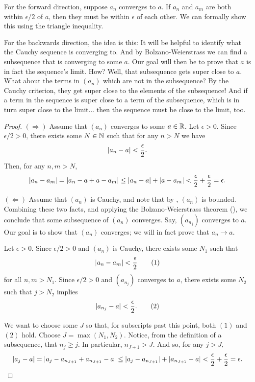 \begin{proofsketch}
  For the forward direction, suppose $a_n$ converges to $a$. If $a_n$
  and $a_m$ are both within $\epsilon / 2$ of $a$, then they must be
  within $\epsilon$ of each other. We can formally show this using
  the triangle inequality.

  For the backwards direction, the idea is this: It will be helpful
  to identify what the Cauchy sequence is converging to. And by
  Bolzano-Weierstrass we can find a subsequence that is converging to
  some $a$. Our goal will then be to prove that $a$ is in fact the
  sequence's limit. How? Well, that subsequence gets super close to
  $a$. What about the terms in $(a_n)$ which are not in the
  subsequence? By the Cauchy criterion, they get super close to the
  elements of the subsequence! And if a term in the sequence is super
  close to a term of the subsequence, which is in turn super close to
  the limit... then the sequence must be close to the limit, too.
\end{proofsketch}

\begin{proof}
  \phantom{.}

  $(\Rightarrow)$ Assume that $(a_n)$ converges to some $a \in \mathbb R$.
  Let $\epsilon > 0$. Since $\epsilon / 2 > 0$, there exists some $N
  \in \mathbb N$ such that for any $n > N$ we have
  \[
    | a_n - a | < \frac{\epsilon}{2}.
  \]
  Then, for any $n, m > N$,
  \[
    | a_n - a_m | = | a_n - a + a - a_m |
    \leq | a_n - a | + | a - a_m |
    < \frac{\epsilon}{2} + \frac{\epsilon}{2}
    = \epsilon.
  \]

  $(\Leftarrow)$ Assume that $(a_n)$ is Cauchy, and note that by
  , $(a_n)$ is bounded.
  Combining these two facts, and applying the Bolzano-Weierstrass
  theorem (), we conclude that some
  subsequence of $(a_n)$ converges. Say, $(a_{n_j})$ converges to
  $a$. Our goal is to show that $(a_n)$ converges; we will in fact
  prove that $a_n \to a$.

  Let $\epsilon > 0$. Since $\epsilon / 2 > 0$ and $(a_n)$ is Cauchy,
  there exists some $N_1$ such that
  \[
    | a_n - a_m | < \frac{\epsilon}{2} \tag{$1$}
  \]
  for all $n, m > N_1$. Since $\epsilon / 2 > 0$ and $(a_{n_j})$
  converges to $a$, there exists some $N_2$ such that $j > N_2$ implies
  \[
    | a_{n_j} - a | < \frac{\epsilon}{2}. \tag{$2$}
  \]

  We want to choose some $J$ so that, for subscripts past this point,
  both $(1)$ and $(2)$ hold. Choose $J = \max(N_1,
  N_2)$. Notice, from the definition of a subsequence,
  that $n_j \geq j$. In particular, $n_{J+1} > J$. And so, for any $j > J$,
  \[
    | a_j - a | = | a_j - a_{n_{J+1}} + a_{n_{J+1}} - a |
    \leq | a_j - a_{n_{J+1}} | + | a_{n_{J+1}} - a |
    < \frac{\epsilon}{2} + \frac{\epsilon}{2}
    = \epsilon.
  \]
\end{proof}

